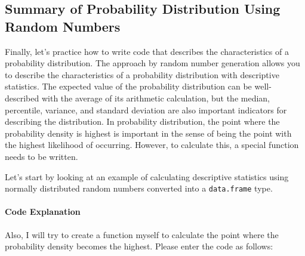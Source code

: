 \documentclass{ltjsbook}
\begin{document}
\subsection{Summary of Probability Distribution Using Random Numbers}
Finally, let's practice how to write code that describes the characteristics of a probability distribution.
The approach by random number generation allows you to describe the characteristics of a probability distribution with descriptive statistics. The expected value of the probability distribution can be well-described with the average of its arithmetic calculation, but the median, percentile, variance, and standard deviation are also important indicators for describing the distribution.
In probability distribution, the point where the probability density is highest is important in the sense of being the point with the highest likelihood of occurring. However, to calculate this, a special function needs to be written.

Let's start by looking at an example of calculating descriptive statistics using normally distributed random numbers converted into a \texttt{data.frame} type.


\paragraph{Code Explanation}


Also, I will try to create a function myself to calculate the point where the probability density becomes the highest. Please enter the code as follows:

\end{document}
